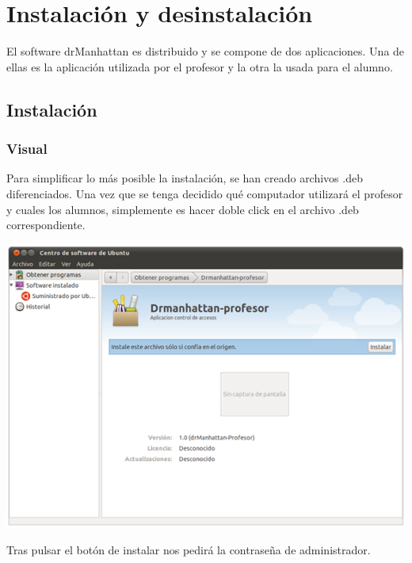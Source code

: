 \documentclass[a4paper,11pt]{article}
\begin{document}
\newpage

\section{Instalación y desinstalación}

El software drManhattan es distribuido y se compone de dos aplicaciones. Una de ellas es la aplicación utilizada por el profesor y la otra la usada para el alumno.

\subsection{Instalación}

\subsubsection{Visual}

Para simplificar lo más posible la instalación, se han creado archivos .deb diferenciados. Una vez que se tenga decidido qué computador utilizará el profesor y cuales los alumnos, simplemente es hacer doble click en el archivo .deb correspondiente.

\begin{center}

    \includegraphics[width=.90\linewidth]{imagenes/inst1}

\end{center}

Tras pulsar el botón de instalar nos pedirá la contraseña de administrador.
\end{document}
